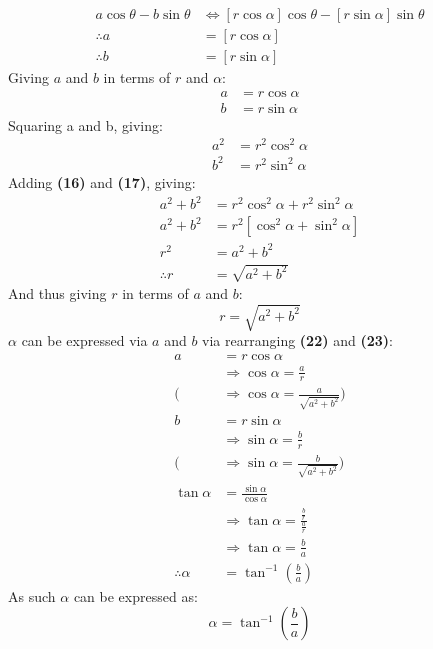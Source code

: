 \documentclass{article}
\begin{document}
        \begin{align*}
        a\cos{\theta} - b\sin{\theta} &\Leftrightarrow [r\cos\alpha]\cos{\theta} - [r\sin\alpha]\sin{\theta} \\
        \therefore a &= [r\cos\alpha] \\
        \therefore b &= [r\sin\alpha]
        \end{align*}
        Giving $a$ and $b$ in terms of $r$ and $\alpha$:
        \begin{align}
        a &= r\cos\alpha \\
        b &= r\sin\alpha
        \end{align}
        Squaring a and b, giving:
        \begin{align}
        a^2 &= r^2\cos^2{\alpha} \\
        b^2 &= r^2\sin^2{\alpha}
        \end{align}
        Adding \textbf{(16)} and \textbf{(17)}, giving:
        \begin{align*}
        a^2 + b^2 &= r^2\cos^2{\alpha} + r^2\sin^2{\alpha} \\
        a^2 + b^2 &= r^2[\cos^2{\alpha} + \sin^2{\alpha}] \\
        r^2 &= a^2 + b^2 \\
        \therefore r &= \sqrt{a^2 + b^2}
        \end{align*}
        And thus giving $r$ in terms of $a$ and $b$:
        \begin{equation}
        r = \sqrt{a^2 + b^2}
        \end{equation}
        $\alpha$ can be expressed via $a$ and $b$ via rearranging \textbf{(22)} and \textbf{(23)}:
        \begin{align*}
        a &= r\cos\alpha \\
        &\Rightarrow \cos\alpha = \frac{a}{r} \\
        (&\Rightarrow \cos\alpha = \frac{a}{\sqrt{a^2 + b^2}}) \\
        b &= r\sin\alpha \\
        &\Rightarrow \sin\alpha = \frac{b}{r} \\
        (&\Rightarrow \sin\alpha = \frac{b}{\sqrt{a^2 + b^2}}) \\
        \tan\alpha &= \frac{\sin\alpha}{\cos\alpha} \\
        &\Rightarrow \tan\alpha = \frac{\frac{b}{r}}{\frac{a}{r}} \\
        &\Rightarrow \tan\alpha = \frac{b}{a} \\
        \therefore \alpha &= \tan^{-1}{\left( \frac{b}{a}\right) }
        \end{align*}
        As such $\alpha$ can be expressed as:
        \begin{equation}
        \alpha = \tan^{-1}{\left( \frac{b}{a}\right) }
        \end{equation}
\end{document}
